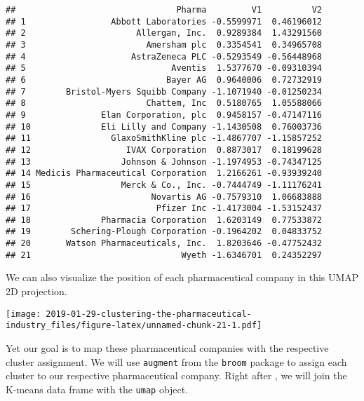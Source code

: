 \documentclass[]{article}
\newenvironment{Shaded}{\begin{snugshade}}{\end{snugshade}}
\newcommand{\KeywordTok}[1]{\textcolor[rgb]{0.13,0.29,0.53}{\textbf{#1}}}
\newcommand{\DataTypeTok}[1]{\textcolor[rgb]{0.13,0.29,0.53}{#1}}
\newcommand{\StringTok}[1]{\textcolor[rgb]{0.31,0.60,0.02}{#1}}
\newcommand{\CommentTok}[1]{\textcolor[rgb]{0.56,0.35,0.01}{\textit{#1}}}
\newcommand{\OperatorTok}[1]{\textcolor[rgb]{0.81,0.36,0.00}{\textbf{#1}}}
\newcommand{\NormalTok}[1]{#1}
\begin{document}
\begin{verbatim}
##                                Pharma         V1          V2
## 1                 Abbott Laboratories -0.5599971  0.46196012
## 2                      Allergan, Inc.  0.9289384  1.43291560
## 3                        Amersham plc  0.3354541  0.34965708
## 4                     AstraZeneca PLC -0.5293549 -0.56448968
## 5                             Aventis  1.5377670 -0.09310394
## 6                            Bayer AG  0.9640006  0.72732919
## 7        Bristol-Myers Squibb Company -1.1071940 -0.01250234
## 8                        Chattem, Inc  0.5180765  1.05588066
## 9               Elan Corporation, plc  0.9458157 -0.47147116
## 10              Eli Lilly and Company -1.1430508  0.76003736
## 11                GlaxoSmithKline plc -1.4867707 -1.15857252
## 12                   IVAX Corporation  0.8873017  0.18199628
## 13                  Johnson & Johnson -1.1974953 -0.74347125
## 14 Medicis Pharmaceutical Corporation  1.2166261 -0.93939240
## 15                  Merck & Co., Inc. -0.7444749 -1.11176241
## 16                        Novartis AG -0.7579310  1.06683888
## 17                         Pfizer Inc -1.4173004 -1.53152437
## 18              Pharmacia Corporation  1.6203149  0.77533872
## 19        Schering-Plough Corporation -0.1964202  0.04833752
## 20       Watson Pharmaceuticals, Inc.  1.8203646 -0.47752432
## 21                              Wyeth -1.6346701  0.24352297
\end{verbatim}

We can also visualize the position of each pharmaceutical company in
this UMAP 2D projection.

\begin{Shaded}
\end{Shaded}

\texttt{[image: 2019-01-29-clustering-the-pharmaceutical-industry\_files/figure-latex/unnamed-chunk-21-1.pdf]}

Yet our goal is to map these pharmaceutical companies with the
respective cluster assignment. We will use \texttt{augment} from the
\texttt{broom} package to assign each cluster to our respective
pharmaceutical company. Right after , we will join the K-means data
frame with the \texttt{umap} object.
\end{document}
